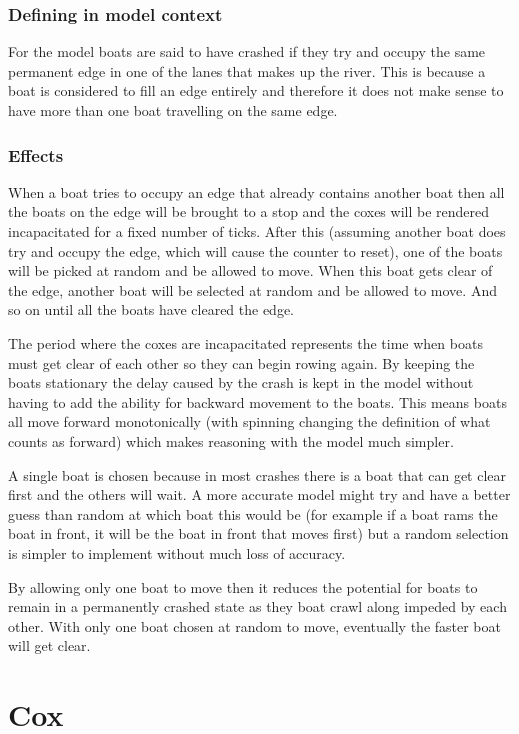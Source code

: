       \subsubsection{Defining in model context}
      For the model boats are said to have crashed if they try and occupy the same permanent edge in one of the lanes that makes up the river. This is because a boat is considered to fill an edge entirely and therefore it does not make sense to have more than one boat travelling on the same edge.

      \subsubsection{Effects}
      When a boat tries to occupy an edge that already contains another boat then all the boats on the edge will be brought to a stop and the coxes will be rendered incapacitated for a fixed number of ticks. After this (assuming another boat does try and occupy the edge, which will cause the counter to reset), one of the boats will be picked at random and be allowed to move. When this boat gets clear of the edge, another boat will be selected at random and be allowed to move. And so on until all the boats have cleared the edge.
      
      The period where the coxes are incapacitated represents the time when boats must get clear of each other so they can begin rowing again. By keeping the boats stationary the delay caused by the crash is kept in the model without having to add the ability for backward movement to the boats. This means boats all move forward monotonically (with spinning changing the definition of what counts as forward) which makes reasoning with the model much simpler.
      
      A single boat is chosen because in most crashes there is a boat that can get clear first and the others will wait. A more accurate model might try and have a better guess than random at which boat this would be (for example if a boat rams the boat in front, it will be the boat in front that moves first) but a random selection is simpler to implement without much loss of accuracy.
      
      By allowing only one boat to move then it reduces the potential for boats to remain in a permanently crashed state as they boat crawl along impeded by each other. With only one boat chosen at random to move, eventually the faster boat will get clear.
      
    \section{Cox}
